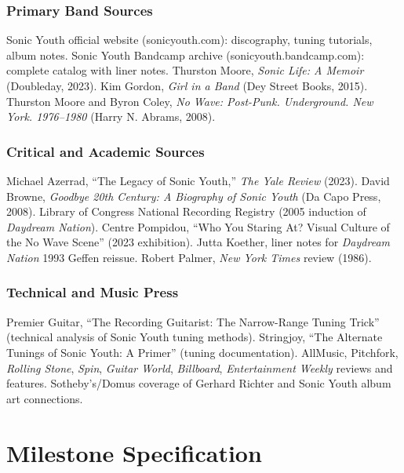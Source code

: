 \documentclass[11pt,letterpaper]{article}
\newcommand{\stageheader}[2]{%
  \noindent\colorbox{#2}{\makebox[\textwidth][l]{%
    \textcolor{white}{\bfseries\sffamily\hspace{6pt}#1\hspace{6pt}}}}%
  \vspace{0.5em}\par%
}
\begin{document}
\subsubsection{Primary Band Sources}

Sonic Youth official website (sonicyouth.com): discography, tuning tutorials, album notes. Sonic Youth Bandcamp archive (sonicyouth.bandcamp.com): complete catalog with liner notes. Thurston Moore, \textit{Sonic Life: A Memoir} (Doubleday, 2023). Kim Gordon, \textit{Girl in a Band} (Dey Street Books, 2015). Thurston Moore and Byron Coley, \textit{No Wave: Post-Punk. Underground. New York. 1976--1980} (Harry N. Abrams, 2008).

\subsubsection{Critical and Academic Sources}

Michael Azerrad, ``The Legacy of Sonic Youth,'' \textit{The Yale Review} (2023). David Browne, \textit{Goodbye 20th Century: A Biography of Sonic Youth} (Da Capo Press, 2008). Library of Congress National Recording Registry (2005 induction of \textit{Daydream Nation}). Centre Pompidou, ``Who You Staring At? Visual Culture of the No Wave Scene'' (2023 exhibition). Jutta Koether, liner notes for \textit{Daydream Nation} 1993 Geffen reissue. Robert Palmer, \textit{New York Times} review (1986).

\subsubsection{Technical and Music Press}

Premier Guitar, ``The Recording Guitarist: The Narrow-Range Tuning Trick'' (technical analysis of Sonic Youth tuning methods). Stringjoy, ``The Alternate Tunings of Sonic Youth: A Primer'' (tuning documentation). AllMusic, Pitchfork, \textit{Rolling Stone}, \textit{Spin}, \textit{Guitar World}, \textit{Billboard}, \textit{Entertainment Weekly} reviews and features. Sotheby's/Domus coverage of Gerhard Richter and Sonic Youth album art connections.

\newpage

\stageheader{STAGE 3 --- MISSION PACKAGE}{tertiary}

\section{Milestone Specification}
\end{document}
